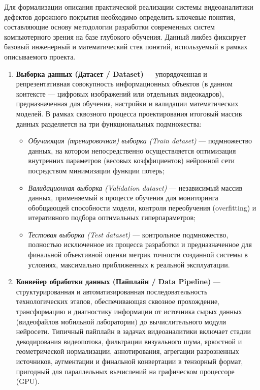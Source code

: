 \documentclass[a4paper,12pt]{article}
\begin{document}
Для формализации описания практической реализации системы видеоаналитики дефектов дорожного покрытия необходимо определить ключевые понятия, составляющие основу методологии разработки современных систем компьютерного зрения на базе глубокого обучения. Данный ликбез фиксирует базовый инженерный и математический стек понятий, используемый в рамках описываемого проекта.

\begin{enumerate}
    \item \textbf{Выборка данных (Датасет / Dataset)} --- упорядоченная и репрезентативная совокупность информационных объектов (в данном контексте --- цифровых изображений или отдельных видеокадров), предназначенная для обучения, настройки и валидации математических моделей. В рамках сквозного процесса проектирования итоговый массив данных разделяется на три функциональных подмножества:
    \begin{itemize}
        \item \textit{Обучающая (тренировочная) выборка (Train dataset)} --- подмножество данных, на котором непосредственно осуществляется оптимизация внутренних параметров (весовых коэффициентов) нейронной сети посредством минимизации функции потерь;
        \item \textit{Валидационная выборка (Validation dataset)} --- независимый массив данных, применяемый в процессе обучения для мониторинга обобщающей способности модели, контроля переобучения (overfitting) и итеративного подбора оптимальных гиперпараметров;
        \item \textit{Тестовая выборка (Test dataset)} --- контрольное подмножество, полностью исключенное из процесса разработки и предназначенное для финальной объективной оценки метрик точности созданной системы в условиях, максимально приближенных к реальной эксплуатации.
    \end{itemize}

    \item \textbf{Конвейер обработки данных (Пайплайн / Data Pipeline)} --- структурированная и автоматизированная последовательность технологических этапов, обеспечивающая сквозное прохождение, трансформацию и диагностику информации от источника сырых данных (видеофайлов мобильной лаборатории) до вычислительного модуля нейросети. Типичный пайплайн в задачах видеоаналитики включает стадии декодирования видеопотока, фильтрации визуального шума, яркостной и геометрической нормализации, аннотирования, агрегации разрозненных источников, аугментации и финальной конвертации в тензорный формат, пригодный для параллельных вычислений на графическом процессоре (GPU).


\end{enumerate}
\end{document}
